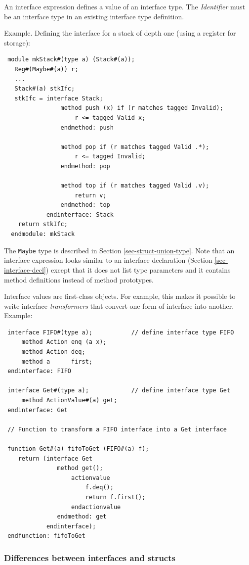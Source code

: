 \documentclass[twoside,letterpaper]{article}
\newcommand{\nterm}[1]{\emph{#1}}
\begin{document}
An interface expression defines a value of an interface type.  The
{\nterm{Identifier}} must be an interface type in an existing
interface type definition.

Example.  Defining the interface for a stack of depth one (using a
register for storage):
\begin{verbatim}
 module mkStack#(type a) (Stack#(a));
   Reg#(Maybe#(a)) r;
   ...
   Stack#(a) stkIfc;
   stkIfc = interface Stack;
                method push (x) if (r matches tagged Invalid);
                    r <= tagged Valid x;
                endmethod: push

                method pop if (r matches tagged Valid .*);
                    r <= tagged Invalid;
                endmethod: pop

                method top if (r matches tagged Valid .v);
                    return v;
                endmethod: top
            endinterface: Stack
    return stkIfc;
  endmodule: mkStack
\end{verbatim}
The \texttt{Maybe} type is described in Section
{\ref{sec-struct-union-type}}.  Note that an interface expression
looks similar to an interface declaration (Section
\ref{sec-interface-decl}) except that it does not list type parameters
and it contains method definitions instead of method prototypes.

Interface values are first-class objects.  For example, this makes it
possible to write interface \emph{transformers} that convert one form
of interface into another.  Example:
\begin{verbatim}
 interface FIFO#(type a);           // define interface type FIFO
     method Action enq (a x);
     method Action deq;
     method a      first;
 endinterface: FIFO

 interface Get#(type a);            // define interface type Get
     method ActionValue#(a) get;
 endinterface: Get

 // Function to transform a FIFO interface into a Get interface

 function Get#(a) fifoToGet (FIFO#(a) f);
    return (interface Get
               method get();
                   actionvalue
                       f.deq();
                       return f.first();
                   endactionvalue
               endmethod: get
            endinterface);
 endfunction: fifoToGet
\end{verbatim}


\subsubsection{Differences between interfaces and structs}
\end{document}
